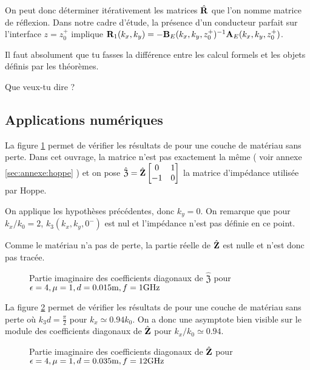     On peut donc déterminer itérativement les matrices \(\hat{\mathbf{R}}\) que l'on nomme matrice de réflexion.
    Dans notre cadre d'étude, la présence d'un conducteur parfait sur l'interface \(z=z_0^+\) implique \(\mathbf{R}_{1}(k_x,k_y) = -\mathbf{B}_E(k_x,k_y,z_0^+)^{-1}\mathbf{A}_E(k_x,k_y,z_0^+)\).
    \begin{REM}
      Il faut absolument que tu fasses la différence entre les calcul formels et les objets définis par les théorèmes.
    \end{REM}
    \begin{REP}
      Que veux-tu dire ?
    \end{REP}

\subsection{Applications numériques}

  La figure \ref{fig:imp_fourier:plan:hoppe} permet de vérifier les résultats de \cite[p.~33]{hoppe_impedance_1995} pour une couche de matériau sans perte. Dans cet ouvrage, la matrice n’est pas exactement la même ( voir annexe \ref{sec:annexe:hoppe} ) et on pose \(\hat{\mathfrak{Z}} = \hat{\mathbf{Z}}\begin{bmatrix}0&1\\-1&0\end{bmatrix}\) la matrice d'impédance utilisée par Hoppe.

  On applique les hypothèses précédentes, donc \(k_y=0\). On remarque que pour \(k_x\slash k_0=2\), \(k_3(k_x,k_y,0^-)\) est nul et l'impédance n'est pas définie en ce point. 

  Comme le matériau n'a pas de perte, la partie réelle de \(\hat{\mathfrak{\mathbf{Z}}}\) est nulle et n'est donc pas tracée.
  \begin{figure}[!hbt]
      \centering
      
      \caption[Reproduction résultat Hoppe & Rahmat-Samii p.~33]{Partie imaginaire des coefficients diagonaux de \(\hat{\mathfrak Z}\) pour \(\epsilon = 4, \mu = 1, d=0.015\text{m}, f=1\text{GHz}\)}
      \label{fig:imp_fourier:plan:hoppe}
  \end{figure}

  La figure \ref{fig:imp_fourier:plan:soudais} permet de vérifier les résultats de \cite{soudais_3d_2017} pour une couche de matériau sans perte où \(k_3d = \frac{\pi}{2}\) pour \(k_x \simeq 0.94 k_0\). On a donc une asymptote bien visible sur le module des coefficients diagonaux de \(\hat{\mathbf{Z}}\) pour \(k_x\slash k_0 \simeq 0.94\).
  \begin{figure}[!hbt]
      \centering
      
      \caption[Reproduction résultat P. Soudais p.~11]{Partie imaginaire des coefficients diagonaux de \(\hat{\mathbf{Z}}\) pour \(\epsilon = 4, \mu = 1, d=0.035\text{m}, f=12\text{GHz}\)}
      \label{fig:imp_fourier:plan:soudais}
  \end{figure}

